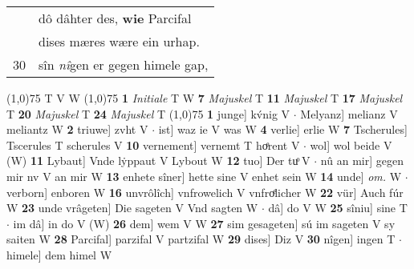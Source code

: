 \documentclass[8pt,a4paper,notitlepage]{article}
\begin{document}
\begin{table}[ht]
\begin{minipage}[t]{0.5\linewidth}
\begin{tabular}{rl}
 & dô dâhter des, \textbf{wie} Parcifal\\ 
 & dises mæres wære ein urhap.\\ 
30 & sîn \textit{nî}gen er gegen himele gap,\\ 
\end{tabular}
\scriptsize
\line(1,0){75} \newline
T V W \newline
\line(1,0){75} \newline
\textbf{1} \textit{Initiale} T W  \textbf{7} \textit{Majuskel} T  \textbf{11} \textit{Majuskel} T  \textbf{17} \textit{Majuskel} T  \textbf{20} \textit{Majuskel} T  \textbf{24} \textit{Majuskel} T  \newline
\line(1,0){75} \newline
\textbf{1} junge] kv́nig V  $\cdot$ Melyanz] melianz V meliantz W \textbf{2} triuwe] zvht V  $\cdot$ ist] waz ie V was W \textbf{4} verlie] erlie W \textbf{7} Tscherules] Tscerules T scherules V \textbf{10} vernement] vernemt T hoͤrent V  $\cdot$ wol] wol beide V (W) \textbf{11} Lybaut] Vnde lẏppaut V Lybout W \textbf{12} tuo] Der tuͦ V  $\cdot$ nû an mir] gegen mir nv V an mir W \textbf{13} enhete sîner] hette sine V enhet sein W \textbf{14} unde] \textit{om.} W  $\cdot$ verborn] enboren W \textbf{16} unvrôlîch] vnfrowelich V vnfroͤlicher W \textbf{22} vür] Auch fúr W \textbf{23} unde vrâgeten] Die sageten V Vnd sagten W  $\cdot$ dâ] do V W \textbf{25} sîniu] sine T  $\cdot$ im dâ] in do V (W) \textbf{26} dem] wem V W \textbf{27} sim gesageten] sú im sageten V sy saiten W \textbf{28} Parcifal] parzifal V partzifal W \textbf{29} dises] Diz V \textbf{30} nîgen] ingen T  $\cdot$ himele] dem himel W \newline
\end{minipage}
\end{table}
\end{document}
